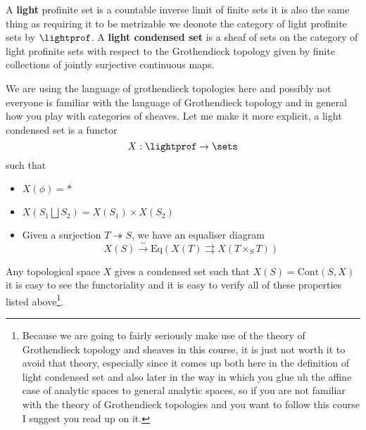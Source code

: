 \begin{definition}
    A \textbf{light} profinite set is a countable inverse limit of finite sets it is also the same thing as requiring it to be 
    metrizable we deonote the category of light profinite sets by $\lightprof$. A \textbf{light condensed set} is a sheaf of sets 
    on the category of light profinite sets with respect to the Grothendieck topology given by finite collections of jointly 
    surjective continuous maps.
\end{definition}    

We are using the language of grothendieck topologies here and possibly not everyone is familiar with the language of Grothendieck 
topology and in  general how you play with categories of sheaves. Let me make it more explicit, a light condensed set is a functor 
$$ X : \lightprof \rightarrow \sets$$
such that 
\begin{itemize}
    \item $X(\phi) = *$
    \item $X(S_1 \bigsqcup S_2) = X(S_1) \times X(S_2)$
    \item Given a surjection $T \twoheadrightarrow S$, we have an equaliser diagram 
    $$X(S) \xrightarrow{\sim} \mathrm{Eq}(X(T) \rightrightarrows X(T \times_S T))$$
\end{itemize}


\begin{example}
    
Any topological space $X$ gives a condensed set such that $X(S) = \mathrm{Cont}(S,X)$ it is easy to see the functoriality and it 
is easy to verify all of these properties listed above\footnote{Because we are going to fairly seriously make use of the theory of 
Grothendieck topology and sheaves in this course, it is just not worth it to avoid that theory, especially since it comes up both 
here in the definition of light condensed set and also later in the way in which you glue uh the affine case of analytic spaces to 
general analytic spaces, so if you are not familiar with the theory of Grothendieck topologies and you want to follow this course I 
suggest you read up on it.}.
\end{example}





